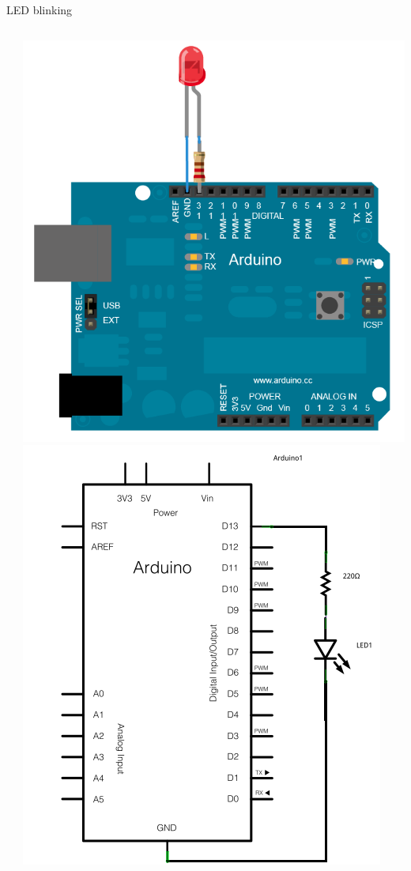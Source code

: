 \documentclass[compress]{beamer}
\begin{document}
\begin{frame}[fragile]{LED blinking}
\begin{columns}
\begin{column}{0.7\linewidth}
        \end{column}
        \begin{column}{0.3\linewidth}
            \begin{center}
                \includegraphics[width=0.35\paperheight]{arduino-led}\\
                \includegraphics[width=0.3\paperheight]{arduino-led-schematic}
            \end{center}
        \end{column}
    \end{columns}
\end{frame}
\end{document}

